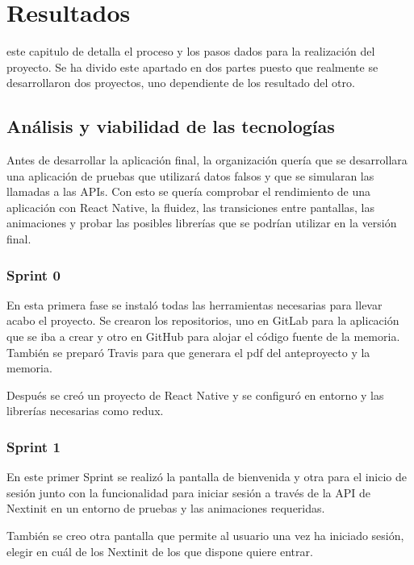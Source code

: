 \chapter{Resultados}
\label{chap:resultados}

 este capitulo de detalla el proceso y los pasos dados para la realización del 
proyecto. Se ha divido este apartado en dos partes puesto que realmente se 
desarrollaron dos proyectos, uno dependiente de los resultado del otro. 

\section{Análisis y viabilidad de las tecnologías}

Antes de desarrollar la aplicación final, la organización quería que se desarrollara una 
aplicación de pruebas que utilizará datos falsos y que se simularan las llamadas a las APIs. Con 
esto se quería comprobar el rendimiento de una aplicación con React Native, la fluidez, las 
transiciones entre pantallas, las animaciones y probar las posibles librerías que se 
podrían utilizar en la versión final.

\subsection{Sprint 0}

En esta primera fase se instaló todas las herramientas necesarias para llevar acabo el 
proyecto. Se crearon los repositorios, uno en GitLab para la aplicación que se iba 
a crear y otro en GitHub para alojar el código fuente de la memoria. También se 
preparó Travis para que generara el pdf del anteproyecto y la memoria.

Después se creó un proyecto de React Native y se configuró en entorno y  las librerías 
necesarias como redux.

\subsection{Sprint 1}

En este primer Sprint se realizó la pantalla de bienvenida y otra para el inicio de sesión junto 
con la funcionalidad para iniciar sesión a través de la API de Nextinit en un entorno de 
pruebas y las animaciones requeridas.

También se creo otra pantalla que permite al usuario una vez ha iniciado sesión,
elegir en cuál de los Nextinit de los que dispone quiere entrar.


